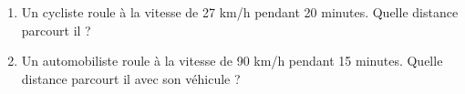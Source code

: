 
\begin{enumerate}
\item Un cycliste roule à la vitesse de 27 km/h pendant 20 minutes. Quelle distance parcourt il ?
\item Un automobiliste roule à la vitesse de 90 km/h pendant 15 minutes. Quelle distance parcourt il avec son véhicule ?
\end{enumerate}